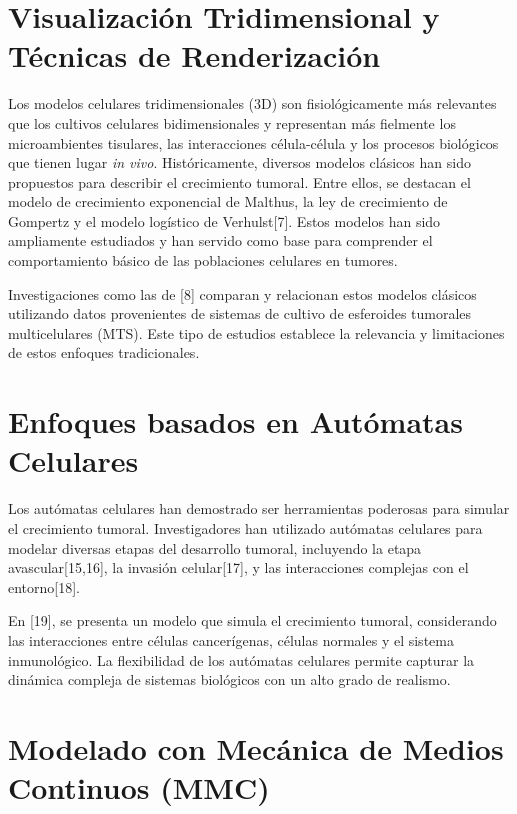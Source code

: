 \section{Visualización Tridimensional y Técnicas de Renderización}

Los modelos celulares tridimensionales (3D) son fisiológicamente más relevantes que los cultivos celulares bidimensionales y representan más fielmente los microambientes tisulares, las interacciones célula-célula y los procesos biológicos que tienen lugar \textit{in vivo}.
Históricamente, diversos modelos clásicos han sido propuestos para describir el crecimiento tumoral. Entre ellos, se destacan el modelo de crecimiento exponencial de Malthus, la ley de crecimiento de Gompertz y el modelo logístico de Verhulst[7]. Estos modelos han sido ampliamente estudiados y han servido como base para comprender el comportamiento básico de las poblaciones celulares en tumores.

Investigaciones como las de [8] comparan y relacionan estos modelos clásicos utilizando datos provenientes de sistemas de cultivo de esferoides tumorales multicelulares (MTS). Este tipo de estudios establece la relevancia y limitaciones de estos enfoques tradicionales.

\section{Enfoques basados en Autómatas Celulares}

Los autómatas celulares han demostrado ser herramientas poderosas para simular el crecimiento tumoral. Investigadores han utilizado autómatas celulares para modelar diversas etapas del desarrollo tumoral, incluyendo la etapa avascular[15,16], la invasión celular[17], y las interacciones complejas con el entorno[18].

En [19], se presenta un modelo que simula el crecimiento tumoral, considerando las interacciones entre células cancerígenas, células normales y el sistema inmunológico. La flexibilidad de los autómatas celulares permite capturar la dinámica compleja de sistemas biológicos con un alto grado de realismo.

\section{Modelado con Mecánica de Medios Continuos (MMC)}

